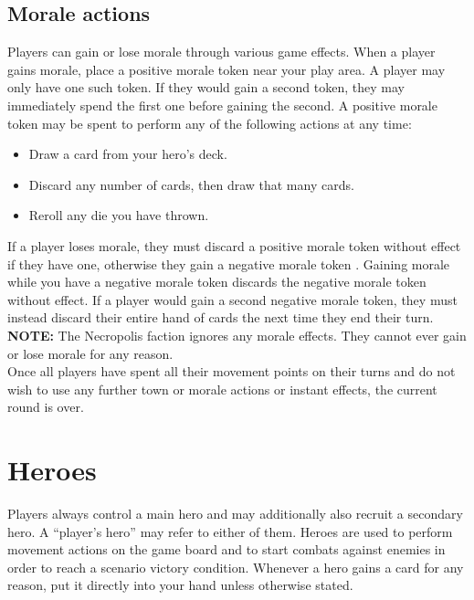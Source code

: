 \documentclass[12pt]{article}
\begin{document}
\subsection*{Morale actions}
Players can gain or lose morale through various game effects. When a player gains morale, place a positive morale token   near your play area. A player may only have one such token. If they would gain a second token, they may immediately spend the first one before gaining the second. A positive morale token may be spent to perform any of the following actions at any time:
\begin{itemize}
\item Draw a card from your hero's deck.
\item Discard any number of cards, then draw that many cards.
\item Reroll any die you have thrown.
\end{itemize}
If a player loses morale, they must discard a positive morale token  without effect if they have one, otherwise they gain a negative morale token . Gaining morale while you have a negative morale token discards the negative morale token without effect. If a player would gain a second negative morale token, they must instead discard their entire hand of cards the next time they end their turn.\\[6pt]
\textbf{NOTE:} The Necropolis faction ignores any morale effects. They cannot ever gain or lose morale for any reason.\\[12pt]
Once all players have spent all their movement points on their turns and do not wish to use any further town or morale actions or instant effects, the current round is over.\\[6pt]

\clearpage

\section[Heroes]{Heroes\hypertarget{Heroes}{}}
Players always control a main hero and may additionally also recruit a secondary hero. A “player’s hero” may refer to either of them. Heroes are used to perform movement actions on the game board and to start combats against enemies in order to reach a scenario victory condition. Whenever a hero gains a card for any reason, put it directly into your hand unless otherwise stated. 
\end{document}
